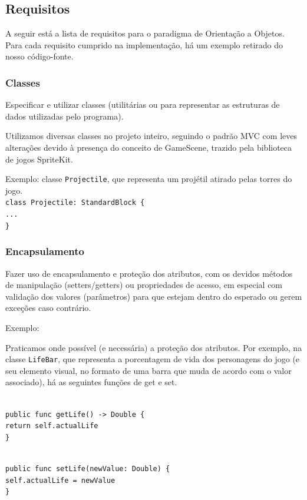 \documentclass[rel_mlp]{iiufrgs}
\newcommand\tab[1][1cm]{\hspace*{#1}}
\begin{document}
\subsection{Requisitos}

A seguir está a lista de requisitos para o paradigma de Orientação a Objetos. Para cada requisito cumprido na implementação, há um exemplo retirado do nosso código-fonte.

\subsubsection{Classes}

Especificar e utilizar classes (utilitárias ou para representar as estruturas de dados utilizadas pelo programa).

Utilizamos diversas classes no projeto inteiro, seguindo o padrão MVC com leves alterações devido à presença do conceito de GameScene, trazido pela biblioteca de jogos SpriteKit.

Exemplo: classe \texttt{Projectile}, que representa um projétil atirado pelas torres do jogo.
\texttt{\\class Projectile: StandardBlock \{\\\tab ...\\\}}


\subsubsection{Encapsulamento}

Fazer uso de encapsulamento e proteção dos atributos, com os devidos métodos de manipulação (setters/getters) ou propriedades de acesso, em especial com validação dos valores (parâmetros) para que estejam dentro do esperado ou gerem exceções caso contrário.

Exemplo:

Praticamos onde possível (e necessária) a proteção dos atributos. Por exemplo, na classe \texttt{LifeBar}, que representa a porcentagem de vida dos personagens do jogo (e seu elemento visual, no formato de uma barra que muda de acordo com o valor associado), há as seguintes funções de get e set.

\texttt{\\public func getLife() -> Double \{\\\tab return self.actualLife\\\}}

\texttt{\\public func setLife(newValue: Double) \{\\\tab self.actualLife = newValue\\\}}
    
\end{document}
